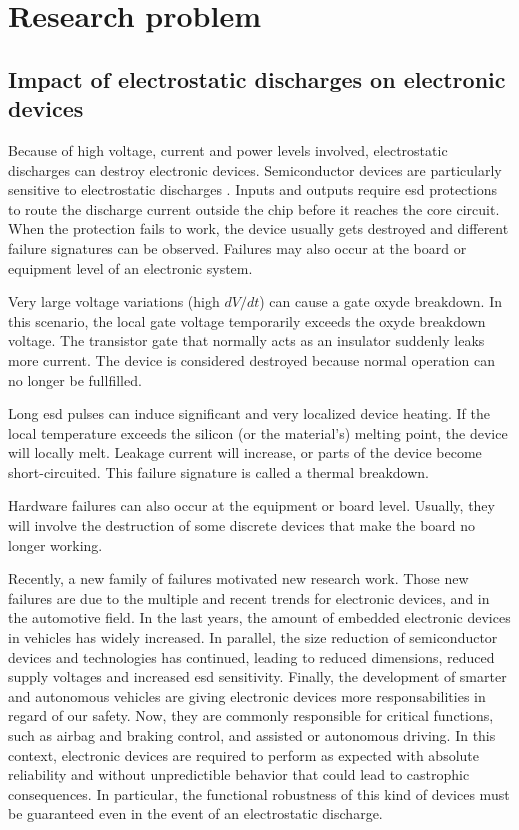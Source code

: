 \section{Research problem}
\subsection{Impact of electrostatic discharges on electronic devices}


Because of high voltage, current and power levels involved, electrostatic discharges can destroy electronic devices.
Semiconductor devices are particularly sensitive to electrostatic discharges \cite{impactESDsemiconductors}.
Inputs and outputs require \gls{esd} protections to route the discharge current outside the chip before it reaches the core circuit.
When the protection fails to work, the device usually gets destroyed and different failure signatures can be observed.
Failures may also occur at the board or equipment level of an electronic system.

Very large voltage variations (high $dV/dt$) can cause a gate oxyde breakdown.
In this scenario, the local gate voltage temporarily exceeds the oxyde breakdown voltage.
The transistor gate that normally acts as an insulator suddenly leaks more current.
The device is considered destroyed because normal operation can no longer be fullfilled.

Long \gls{esd} pulses can induce significant and very localized device heating.
If the local temperature exceeds the silicon (or the material's) melting point, the device will locally melt.
Leakage current will increase, or parts of the device become short-circuited.
This failure signature is called a thermal breakdown.

Hardware failures can also occur at the equipment or board level.
Usually, they will involve the destruction of some discrete devices that make the board no longer working.

Recently, a new family of failures motivated new research work.
Those new failures are due to the multiple and recent trends for electronic devices, and in the automotive field.
In the last years, the amount of embedded electronic devices in vehicles has widely increased.
In parallel, the size reduction of semiconductor devices and technologies has continued, leading to reduced dimensions, reduced supply voltages and increased \gls{esd} sensitivity.
Finally, the development of smarter and autonomous vehicles are giving electronic devices more responsabilities in regard of our safety.
Now, they are commonly responsible for critical functions, such as airbag and braking control, and assisted or autonomous driving.
In this context, electronic devices are required to perform as expected with absolute reliability and without unpredictible behavior that could lead to castrophic consequences.
In particular, the functional robustness of this kind of devices must be guaranteed even in the event of an electrostatic discharge.


